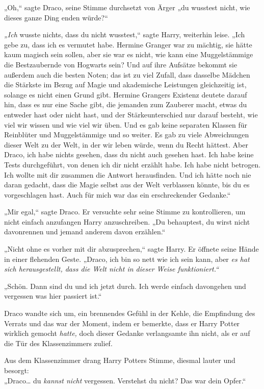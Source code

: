 {„Oh,“ sagte Draco, seine Stimme durchsetzt von Ärger „du wusstest nicht, wie dieses ganze Ding enden würde?“

\emph{„Ich} wusste nichts, dass du nicht wusstest,“ sagte Harry, weiterhin leise. „Ich gebe zu, dass ich es vermutet habe. Hermine Granger war zu mächtig, sie hätte kaum magisch sein sollen, aber sie war es nicht, wie kann eine Muggelstämmige die Bestzaubernde von Hogwarts sein? Und auf ihre Aufsätze bekommt sie außerdem auch die besten Noten; das ist zu viel Zufall, dass dasselbe Mädchen die Stärkste im Bezug auf Magie und akademische Leistungen gleichzeitig ist, solange es nicht einen Grund gibt. Hermine Grangers Existenz deutete darauf hin, dass es nur eine Sache gibt, die jemanden zum Zauberer macht, etwas du entweder hast oder nicht hast, und der Stärkeunterschied nur darauf besteht, wie viel wir wissen und wie viel wir üben. Und es gab keine separaten Klassen für Reinblüter und Muggelstämmige und so weiter. Es gab zu viele Abweichungen dieser Welt zu der Welt, in der wir leben würde, wenn du Recht hättest. Aber Draco, ich habe nichts gesehen, dass du nicht auch gesehen hast. Ich habe keine Tests durchgeführt, von denen ich dir nicht erzählt habe. Ich habe nicht betrogen. Ich wollte mit dir zusammen die Antwort herausfinden. Und ich hätte noch nie daran gedacht, dass die Magie selbst aus der Welt verblassen könnte, bis du es vorgeschlagen hast. Auch für mich war das ein erschreckender Gedanke.“

„Mir egal,“ sagte Draco. Er versuchte sehr seine Stimme zu kontrollieren, um nicht einfach anzufangen Harry anzuschreiben. „Du behauptest, du wirst nicht davonrennen und jemand anderem davon erzählen.“

„Nicht ohne es vorher mit dir abzusprechen,“ sagte Harry. Er öffnete seine Hände in einer flehenden Geste. „Draco, ich bin so nett wie ich sein kann, aber \emph{es hat sich herausgestellt, dass die Welt nicht in dieser Weise funktioniert.“}

„Schön. Dann sind du und ich jetzt durch. Ich werde einfach davongehen und vergessen was hier passiert ist.“

Draco wandte sich um, ein brennendes Gefühl in der Kehle, die Empfindung des Verrats und das war der Moment, indem er bemerkte, dass er Harry Potter wirklich gemocht \emph{hatte,} doch dieser Gedanke verlangsamte ihn nicht, als er auf die Tür des Klassenzimmers zulief.

Aus dem Klassenzimmer drang Harry Potters Stimme, diesmal lauter und besorgt:\\ „Draco… du \emph{kannst nicht} vergessen. Verstehst du nicht? Das war dein Opfer.“

}
